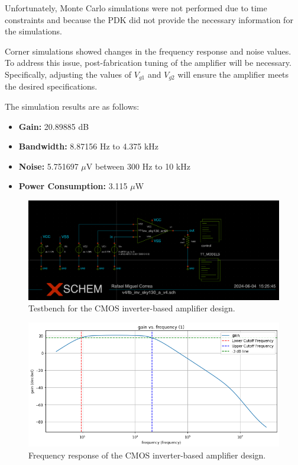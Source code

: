 Unfortunately, Monte Carlo simulations were not performed due to time constraints and because the PDK did not provide the necessary information for the simulations.

Corner simulations showed changes in the frequency response and noise values. To address this issue, post-fabrication tuning of the amplifier will be necessary. 
Specifically, adjusting the values of $V_{g1}$ and $V_{g2}$ will ensure the amplifier meets the desired specifications.

The simulation results are as follows:

\begin{itemize}
\item \textbf{Gain:} 20.89885 dB
\item \textbf{Bandwidth:} 8.87156 Hz to 4.375 kHz
\item \textbf{Noise:} 5.751697 $\mu$V between 300 Hz to 10 kHz
\item \textbf{Power Consumption:} 3.115 $\mu$W
\end{itemize}

\begin{figure}[ht!]
\centering
\includegraphics[width=\textwidth]{Figures/testbench.png}
\caption{Testbench for the CMOS inverter-based amplifier design.}
\label{fig:testbench_v4}
\end{figure}

\begin{figure}[ht!]
\centering
\includegraphics[width=\textwidth]{Figures/frequency_response_v4.png}
\caption{Frequency response of the CMOS inverter-based amplifier design.}
\label{fig:frequency_response_v4}
\end{figure}

